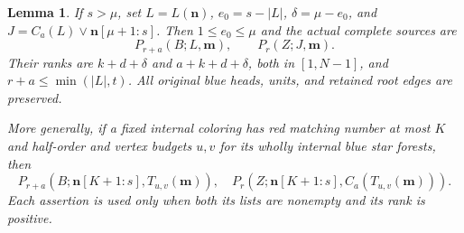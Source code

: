\documentclass[11pt,a4paper]{article}
\newcommand{\nn}{\mathbf n}\newcommand{\mm}{\mathbf m}
\newtheorem{lemma}[theorem]{Lemma}
\theoremstyle{definition}
\begin{document}
\begin{lemma}\label{lem:two-successors}
If $s>\mu$, set $L=L(\nn)$, $e_0=s-|L|$, $\delta=\mu-e_0$, and $J=C_a(L)\vee\nn[\mu+1:s]$. Then $1\le e_0\le\mu$ and the actual complete sources are
\[
 P_{r+a}(B;L,\mm),\qquad P_r(Z;J,\mm).
\]
Their ranks are $k+d+\delta$ and $a+k+d+\delta$, both in $[1,N-1]$, and $r+a\le\min(|L|,t)$. All original blue heads, units, and retained root edges are preserved.

More generally, if a fixed internal coloring has red matching number at most $K$ and half-order and vertex budgets $u,v$ for its wholly internal blue star forests, then
\[
 P_{r+a}(B;\nn[K+1:s],T_{u,v}(\mm)),\quad
 P_r(Z;\nn[K+1:s],C_a(T_{u,v}(\mm))).
\]
Each assertion is used only when both its lists are nonempty and its rank is positive.
\end{lemma}
\end{document}
